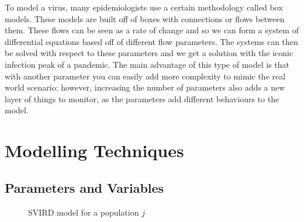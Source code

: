 \documentclass{article}
\begin{document}
\noindent
To model a virus, many epidemiologists use a certain methodology called box models. These models are built off of boxes with connections or flows between them. These flows can be seen as a rate of change and so we can form a system of differential equations based off of different flow parameters. The systems can then be solved with respect to these parameters and we get a solution with the iconic infection peak of a pandemic. The main advantage of this type of model is that with another parameter you can easily add more complexity to mimic the real world scenario; however, increasing the number of parameters also adds a new layer of things to monitor, as the parameters add different behaviours to the model.




\newpage
\section{Modelling Techniques}

\subsection{Parameters and Variables}

    \begin{figure}[!ht]
      \centering
      \caption{SVIRD model for a population $j$}
      \label{fig:SVIRD}
    \end{figure}
\end{document}
